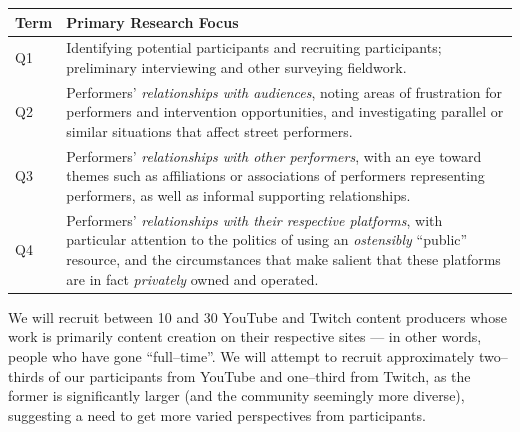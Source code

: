 \documentclass[10pt]{article}
\begin{document}
\vspace*{5pt}

\noindent\begin{tabular}{p{.5in}|p{5.5in}}
  \textbf{Term} & \textbf{Primary Research Focus} \\
\hline
Q1  & Identifying potential participants and recruiting participants;
      preliminary interviewing and other surveying fieldwork. \\
\hline
Q2  & Performers' \textit{relationships with audiences},
      noting areas of frustration for performers and intervention opportunities, and
      investigating parallel or similar situations that affect street performers. \\
\hline
Q3  & Performers' \textit{relationships with other performers},
      with an eye toward themes such as affiliations or associations of performers representing performers,
      as well as informal supporting relationships. \\
\hline
Q4  & Performers' \textit{relationships with their respective platforms},
      with particular attention to the politics of using an \textit{ostensibly} ``public'' resource,
      and the circumstances that make salient that these platforms are in fact \textit{privately} owned and operated.
\end{tabular}

\vspace*{5pt}

We will recruit between 10 and 30 YouTube and Twitch content producers whose work is primarily content creation on their respective sites
--- in other words, people who have gone ``full--time''.
We will attempt to recruit approximately two--thirds of our participants from YouTube and one--third from Twitch, as
the former is significantly larger (and the community seemingly more diverse), suggesting
a need to get more varied perspectives from participants.
\end{document}
